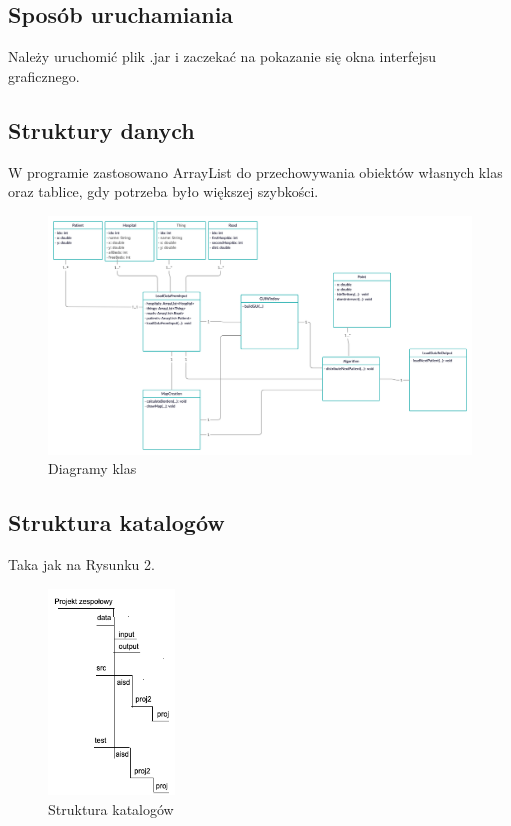 \documentclass[11pt, a4paper]{article}
\begin{document}
    \subsection{Sposób uruchamiania}
Należy uruchomić plik .jar i zaczekać na pokazanie się okna interfejsu graficznego. 
\subsection{Struktury danych}
W programie zastosowano ArrayList do przechowywania obiektów własnych klas oraz tablice, gdy potrzeba było większej szybkości.
\begin{figure}[ht]
    \centering
    \includegraphics[width=1\textwidth]{diagramy.jpg}
    \caption{Diagramy klas}
    \label{fig:folder}
\end{figure}

    \subsection{Struktura katalogów}
    Taka jak na Rysunku 2.
    
    \begin{figure}[ht]
    \centering
    \includegraphics[width=0.3\textwidth]{katalogi.png}
    \caption{Struktura katalogów}
    \label{fig:folder}
\end{figure}
\end{document}
